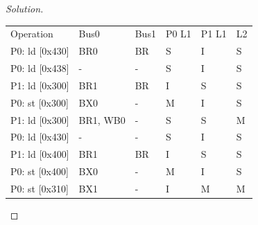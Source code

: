 \documentclass[12pt]{article}
\begin{document}
\begin{proof}[Solution]
	\ \\
	\begin{tabular}{llllll}
		Operation & Bus0  & Bus1  & P0 L1 & P1 L1 & L2 \\
		P0: ld [0x430] & BR0   & BR    & S     & I     & S \\
		P0: ld [0x438] & -     & -     & S     & I     & S \\
		P1: ld [0x300] & BR1   & BR    & I     & S     & S \\
		P0: st [0x300] & BX0   & -     & M     & I     & S \\
		P1: ld [0x300] & BR1, WB0 & -     & S     & S     & M \\
		P0: ld [0x430] & -     & -     & S     & I     & S \\
		P1: ld [0x400] & BR1   & BR    & I     & S     & S \\
		P0: st [0x400] & BX0   & -     & M     & I     & S \\
		P0: st [0x310] & BX1   & -     & I     & M     & M \\
	\end{tabular}%
\end{proof}
\bigskip
\end{document}
